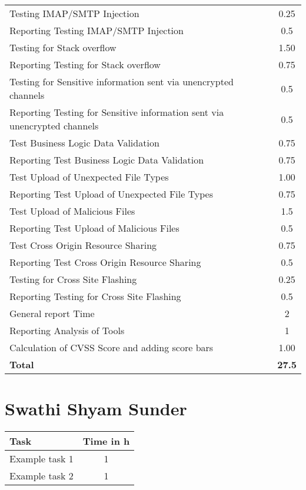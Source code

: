 \begin{table}[H]
\begin{tabular*}{\textwidth}{@{\extracolsep{\fill}} l c@{\extracolsep{0pt}} }
Testing IMAP/SMTP Injection                 & 0.25 \\
Reporting Testing IMAP/SMTP Injection       & 0.5 \\
Testing for Stack overflow                  & 1.50 \\
Reporting Testing for Stack overflow        & 0.75 \\
Testing for Sensitive information sent via unencrypted channels & 0.5 \\
Reporting Testing for Sensitive information sent via unencrypted channels & 0.5 \\
Test Business Logic Data Validation         & 0.75 \\
Reporting Test Business Logic Data Validation & 0.75 \\
Test Upload of Unexpected File Types        & 1.00 \\
Reporting Test Upload of Unexpected File Types & 0.75 \\
Test Upload of Malicious Files              & 1.5 \\
Reporting Test Upload of Malicious Files    & 0.5 \\
Test Cross Origin Resource Sharing          & 0.75 \\
Reporting Test Cross Origin Resource Sharing & 0.5 \\
Testing for Cross Site Flashing             & 0.25 \\
Reporting Testing for Cross Site Flashing   & 0.5 \\
General report Time							& 2 \\
Reporting Analysis of Tools                 & 1 \\
Calculation of CVSS Score and adding score bars	& 1.00 \\ \hline\hline
\textbf{Total}								& \textbf{27.5}
\end{tabular*}
\end{table}
\clearpage

\section{Swathi Shyam Sunder}
\begin{tabular*}{\textwidth}{@{\extracolsep{\fill}} l c@{\extracolsep{0pt}} }
\textbf{Task} & \textbf{Time in h} \\ \hline
Example task 1 & 1 \\
Example task 2 & 1
\end{tabular*}